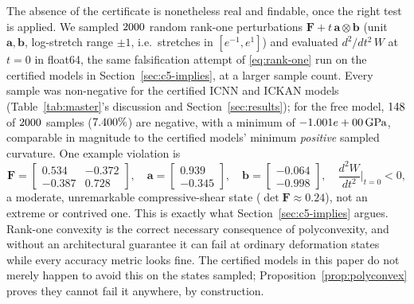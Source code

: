 \documentclass[10pt,a4paper]{article}
\begin{document}
The absence of the certificate is nonetheless real and findable, once
the right test is applied. We sampled $2000$ random
rank-one perturbations $\bm F+t\,\bm a\otimes\bm b$ (unit $\bm a,\bm b$,
log-stretch range $\pm1$, i.e.\ stretches in $[e^{-1},e^{1}]$) and
evaluated $d^2/dt^2\,W$ at $t=0$ in float64, the same falsification
attempt of \eqref{eq:rank-one} run on the certified models in
Section~\ref{sec:c5-implies}, at a larger sample count. Every sample was
non-negative for the certified ICNN and ICKAN models (Table~\ref{tab:master}'s
discussion and Section~\ref{sec:results}); for the free model,
$148$ of $2000$ samples
($7.400\%$) are negative, with a minimum of
$-1.001e+00\,\mathrm{GPa}$, comparable in magnitude to the
certified models' minimum \emph{positive} sampled curvature. One
example violation is
\begin{equation}
 \bm F=\begin{bmatrix}0.534&-0.372\\-0.387&0.728\end{bmatrix},\quad
 \bm a=\begin{bmatrix}0.939\\-0.345\end{bmatrix},\quad
 \bm b=\begin{bmatrix}-0.064\\-0.998\end{bmatrix},\quad
 \frac{d^2W}{dt^2}\bigg|_{t=0}<0,
 \label{eq:free-violation}
\end{equation}
a moderate, unremarkable compressive-shear state ($\det \bm F\approx0.24$),
not an extreme or contrived one. This is exactly what
Section~\ref{sec:c5-implies} argues. Rank-one convexity is the correct
necessary consequence of polyconvexity, and without an architectural
guarantee it can fail at ordinary deformation states while every accuracy
metric looks fine. The certified models in this paper do not merely
happen to avoid this on the states sampled; Proposition~\ref{prop:polyconvex}
proves they cannot fail it anywhere, by construction.
\end{document}
